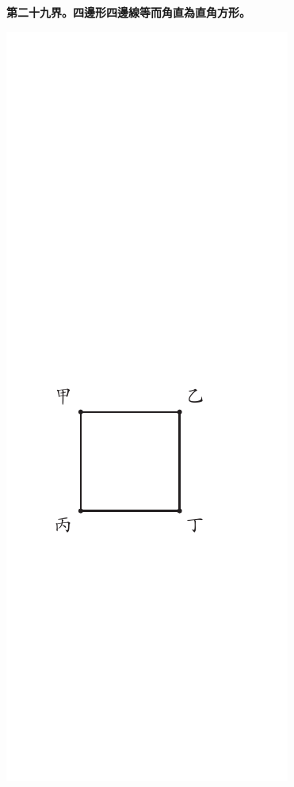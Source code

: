 \documentclass[12pt,b5paper,landscape]{article}
\newcommand{\cthm}[1]{{
\vspace{8pt}

\bfseries #1}}
\begin{document}
\begin{multicols}{2}
\cthm{第二十九界。四邊形四邊線等而角直為直角方形。}
\begin{center}
\includegraphics[angle=90]{eu19}
\end{center}


\end{multicols}
\end{document}
